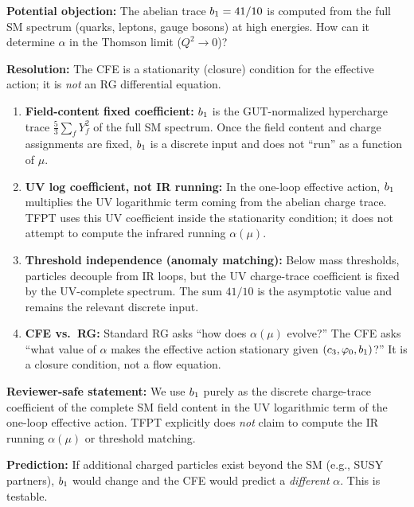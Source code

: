 \begin{tcolorbox}[colback=yellow!3, colframe=yellow!50!black, 
    title={\textbf{Scale Consistency: Why $\bone$ (UV) Determines $\alpha$ (IR)}}, fonttitle=\bfseries\small]
\textbf{Potential objection:} The abelian trace $b_1 = 41/10$ is computed from the full SM spectrum 
(quarks, leptons, gauge bosons) at high energies. How can it determine $\alpha$ in the Thomson 
limit ($Q^2 \to 0$)?

\textbf{Resolution:} The CFE is a stationarity (closure) condition for the effective action; it is \emph{not} an RG differential equation.

\begin{enumerate}[leftmargin=1.5em, topsep=2pt, itemsep=1pt]
    \item \textbf{Field-content fixed coefficient:} $\bone$ is the GUT-normalized hypercharge trace 
        $\frac{5}{3}\sum_f Y_f^2$ of the full SM spectrum. Once the field content and charge assignments are fixed, 
        $\bone$ is a discrete input and does not ``run'' as a function of $\mu$.
    \item \textbf{UV log coefficient, not IR running:} In the one-loop effective action, $\bone$ multiplies the UV logarithmic term 
        coming from the abelian charge trace. TFPT uses this UV coefficient inside the stationarity condition; it does not attempt to compute 
        the infrared running $\alpha(\mu)$.
    \item \textbf{Threshold independence (anomaly matching):} Below mass thresholds, particles decouple from IR loops, but the UV charge-trace 
        coefficient is fixed by the UV-complete spectrum. The sum $41/10$ is the asymptotic value and remains the relevant discrete input.
    \item \textbf{CFE vs.\ RG:} Standard RG asks ``how does $\alpha(\mu)$ evolve?'' The CFE asks ``what value of $\alpha$ makes the effective action stationary 
        given $(c_3,\varphi_0,b_1)$?'' It is a closure condition, not a flow equation.
\end{enumerate}

\textbf{Reviewer-safe statement:} We use $\bone$ purely as the discrete charge-trace coefficient of the complete SM field content in the UV logarithmic term of the 
one-loop effective action. TFPT explicitly does \emph{not} claim to compute the IR running $\alpha(\mu)$ or threshold matching.

\textbf{Prediction:} If additional charged particles exist beyond the SM (e.g., SUSY partners), 
$\bone$ would change and the CFE would predict a \emph{different} $\alpha$. This is testable.
\end{tcolorbox}

